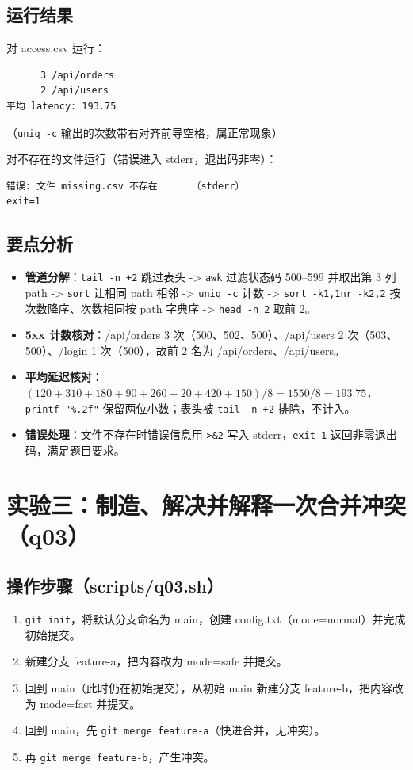 \documentclass[UTF8,fontset=ubuntu]{ctexart}
\begin{document}
\subsection{运行结果}
对 access.csv 运行：
\begin{lstlisting}
      3 /api/orders
      2 /api/users
平均 latency: 193.75
\end{lstlisting}
（\lstinline|uniq -c| 输出的次数带右对齐前导空格，属正常现象）

对不存在的文件运行（错误进入 stderr，退出码非零）：
\begin{lstlisting}
错误: 文件 missing.csv 不存在      （stderr）
exit=1
\end{lstlisting}

\subsection{要点分析}
\begin{itemize}
\item \textbf{管道分解}：\lstinline|tail -n +2| 跳过表头 -> \lstinline|awk| 过滤状态码 500--599 并取出第 3 列 path -> \lstinline|sort| 让相同 path 相邻 -> \lstinline|uniq -c| 计数 -> \lstinline|sort -k1,1nr -k2,2| 按次数降序、次数相同按 path 字典序 -> \lstinline|head -n 2| 取前 2。
\item \textbf{5xx 计数核对}：/api/orders 3 次（500、502、500）、/api/users 2 次（503、500）、/login 1 次（500），故前 2 名为 /api/orders、/api/users。
\item \textbf{平均延迟核对}：$(120+310+180+90+260+20+420+150)/8 = 1550/8 = 193.75$，\lstinline|printf "%.2f"| 保留两位小数；表头被 \lstinline|tail -n +2| 排除，不计入。
\item \textbf{错误处理}：文件不存在时错误信息用 \lstinline|>&2| 写入 stderr，\lstinline|exit 1| 返回非零退出码，满足题目要求。
\end{itemize}

\section{实验三：制造、解决并解释一次合并冲突（q03）}

\subsection{操作步骤（scripts/q03.sh）}
\begin{enumerate}
\item \lstinline|git init|，将默认分支命名为 main，创建 config.txt（mode=normal）并完成初始提交。
\item 新建分支 feature-a，把内容改为 mode=safe 并提交。
\item 回到 main（此时仍在初始提交），从初始 main 新建分支 feature-b，把内容改为 mode=fast 并提交。
\item 回到 main，先 \lstinline|git merge feature-a|（快进合并，无冲突）。
\item 再 \lstinline|git merge feature-b|，产生冲突。
\end{enumerate}
\end{document}
